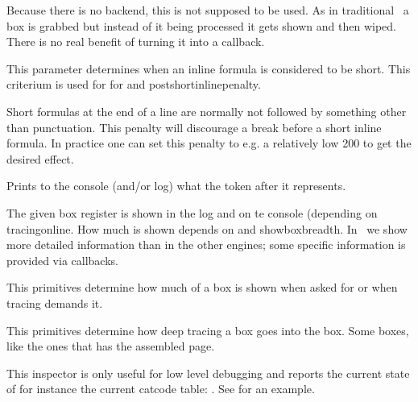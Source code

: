 Because there is no backend, this is not supposed to be used. As in traditional
\TEX\ a box is grabbed but instead of it being processed it gets shown and then
wiped. There is no real benefit of turning it into a callback.

\stopoldprimitive

\startnewprimitive[title={\prm {shortinlinemaththreshold}}]

This parameter determines when an inline formula is considered to be short. This
criterium is used for for  and \prm
{postshortinlinepenalty}.

\stopnewprimitive

\startnewprimitive[title={\prm {shortinlineorphanpenalty}}]

Short formulas at the end of a line are normally not followed by something other
than punctuation. This penalty will discourage a break before a short inline
formula. In practice one can set this penalty to e.g. a relatively low 200 to get
the desired effect.

\stopnewprimitive

\startoldprimitive[title={\prm {show}}]

Prints to the console (and/or log) what the token after
it represents.

\stopoldprimitive

\startoldprimitive[title={\prm {showbox}}]

The given box register is shown in the log and on te console (depending on \prm
{tracingonline}. How much is shown depends on  and \prm
{showboxbreadth}. In \LUAMETATEX\ we show more detailed information than in the
other engines; some specific information is provided via callbacks.

\stopoldprimitive

\startoldprimitive[title={\prm {showboxbreadth}}]

This primitives determine how much of a box is shown when asked for or when
tracing demands it.

\stopoldprimitive

\startoldprimitive[title={\prm {showboxdepth}}]

This primitives determine how deep tracing a box goes into the box. Some boxes,
like the ones that has the assembled page.

\stopoldprimitive

\startnewprimitive[title={\prm {showcodestack}}]

This inspector is only useful for low level debugging and reports the current
state of for instance the current catcode table: \typ {\showcodestack \catcode}.
See  for an example.

